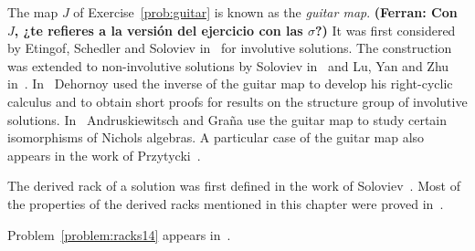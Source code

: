 The map $J$ of Exercise~\ref{prob:guitar} is known as the \emph{guitar map}. {\bf (Ferran: Con $J$, ¿te refieres a la versi\'on del ejercicio con las $\sigma$?)}
It was first considered by Etingof, Schedler and
Soloviev in~\cite{MR1722951} for involutive solutions. The construction was extended to non-involutive solutions
by Soloviev in~\cite{MR1809284} and Lu, Yan and Zhu in~\cite{MR1769723}. In~\cite{MR3374524} Dehornoy
used the inverse of the guitar map to develop his right-cyclic calculus and to
obtain short proofs for results on the structure group of involutive solutions. 
In~\cite{MR1994219} Andruskiewitsch and Graña use the guitar map to study certain isomorphisms of Nichols algebras. 
A particular case of the guitar map also appears in the work of Przytycki~\cite{MR2906433}. 

The derived rack of a solution was first defined in the work of Soloviev~\cite{MR1809284}. Most of the properties
of the derived racks mentioned in this chapter were proved in~\cite{MR3974961}.

Problem~\ref{problem:racks14} appears in~\cite{MR3957904}. 

